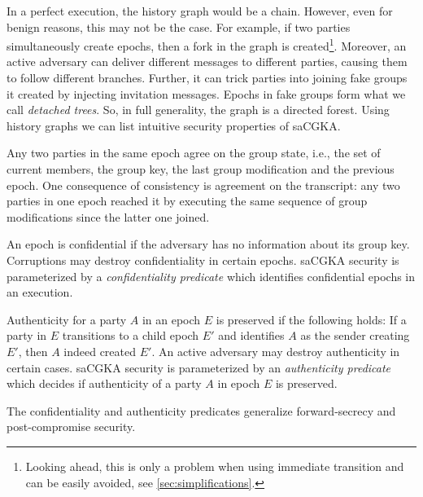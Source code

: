 In a perfect execution, the history graph would be a chain. However, even for
benign reasons, this may not be the case. For example, if two parties
simultaneously create epochs, then a fork in the graph is created\footnote{Looking ahead, this is only a problem when
  using immediate transition and can be easily avoided, see \cref{sec:simplifications}.}. Moreover,
an active adversary can deliver different messages to different parties,
causing them to follow different branches. Further, it can trick parties into
joining fake groups it created by injecting invitation messages. Epochs in
fake groups form what we call \emph{detached trees}. So, in full generality,
the graph is a directed forest.
%
Using history graphs we can list intuitive security properties of saCGKA.
\begin{description}[itemsep=2pt,topsep=2pt,parsep=2pt]
  \item[Consistency] Any two parties in the same epoch agree on the group state, i.e., the set of current members, the group key, the last group modification and the previous epoch. One consequence of consistency is agreement on the transcript: any two parties in one epoch reached it by executing the same sequence of group modifications since the latter one joined.
  \item[Confidentiality] An epoch is confidential if the adversary has no information about its group key. Corruptions may destroy confidentiality in certain epochs. saCGKA security is parameterized by a \emph{confidentiality predicate} which identifies confidential epochs in an execution.
  \item[Authenticity] Authenticity for a party $A$ in an epoch $E$ is preserved if the following holds: If a party in $E$ transitions to a child epoch $E'$ and identifies $A$ as the sender creating $E'$, then $A$ indeed created $E'$. An active adversary may destroy authenticity in certain cases. saCGKA security is parameterized by an \emph{authenticity predicate} which decides if authenticity of a party $A$ in epoch $E$ is preserved.
\end{description}
The confidentiality and authenticity predicates %
generalize forward-secrecy and post-compromise security.

